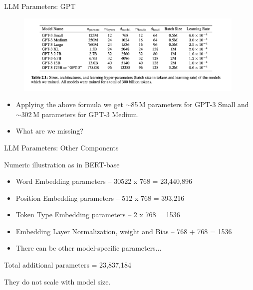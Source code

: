 \begin{vbframe}{LLM Parameters: GPT}




\vfill

\begin{figure}
\centering
\includegraphics[width = 11cm]{figure/gptsize}
\end{figure}

\begin{itemize}
\item Applying the above formula we get $\sim$85\,M parameters for GPT-3 Small and $\sim$302\,M parameters for GPT-3 Medium. 

\item What are we missing?

\end{itemize}



\vfill

\end{vbframe}


\begin{vbframe}{LLM Parameters: Other Components}

\vfill

Numeric illustration as in BERT-base \\ \vskip5mm

\begin{itemize}
    \item Word Embedding parameters -- 30522 x 768 = 23,440,896
    \item Position Embedding parameters -- 512 x 768 = 393,216
	\item Token Type Embedding parameters -- 2 x 768 = 1536
	\item Embedding Layer Normalization, weight and Bias -- 768 + 768 = 1536
	\item There can be other model-specific parameters...
\end{itemize}

\vskip5mm

Total additional parameters = 23,837,184 \vskip3mm

They do not scale with model size.

\vfill

\end{vbframe}

